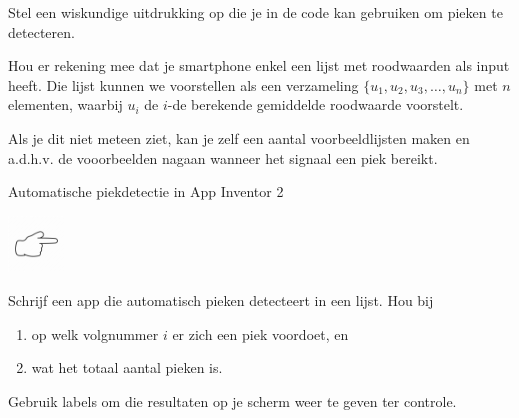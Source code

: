 \begin{oef}
	Stel een wiskundige uitdrukking op die je in de code kan gebruiken om pieken te detecteren. 
	
	Hou er rekening mee dat je smartphone enkel een lijst met roodwaarden als input heeft. Die lijst kunnen we voorstellen als een verzameling $\{ u_1, u_2, u_3, \ldots, u_n \}$ met $n$ elementen, waarbij $u_i$ de $i$-de berekende gemiddelde roodwaarde voorstelt.
	
	Als je dit niet meteen ziet, kan je zelf een aantal voorbeeldlijsten maken en a.d.h.v. de vooorbeelden nagaan wanneer het signaal een piek bereikt.
\end{oef}

\begin{opdracht}{Automatische piekdetectie in App Inventor 2}
	\begin{minipage}{.1\linewidth}
		\includegraphics[width=1.5cm]{inputs/opdracht}
		\vspace{2.5cm}
	\end{minipage}
	\begin{minipage}{.8\linewidth}
		Schrijf een app die automatisch pieken detecteert in een lijst. 
		Hou bij \begin{enumerate}
			\item op welk volgnummer $i$ er zich een piek voordoet, en 
			\item wat het totaal aantal pieken is.
		\end{enumerate} 
		
		Gebruik labels om die resultaten op je scherm weer te geven ter controle.
	\end{minipage}
	

\end{opdracht}
